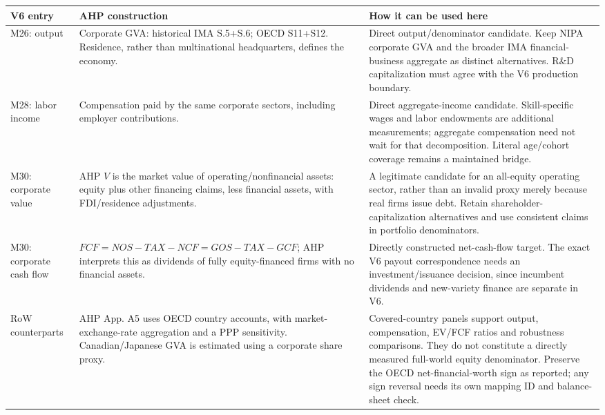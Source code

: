 \documentclass[10pt,a4paper,landscape]{article}
\begin{document}
\begin{longtable}{@{}P{.17\textwidth}P{.38\textwidth}P{.41\textwidth}@{}}
\toprule{}\textbf{V6 entry} & \textbf{AHP construction} & \textbf{How it can be used here}\\\midrule
M26: output & Corporate GVA: historical IMA S.5+S.6; OECD S11+S12. Residence, rather than multinational headquarters, defines the economy. & Direct output/denominator candidate. Keep NIPA corporate GVA and the broader IMA financial-business aggregate as distinct alternatives. R\&D capitalization must agree with the V6 production boundary.\\[6pt]
M28: labor income & Compensation paid by the same corporate sectors, including employer contributions. & Direct aggregate-income candidate. Skill-specific wages and labor endowments are additional measurements; aggregate compensation need not wait for that decomposition. Literal age/cohort coverage remains a maintained bridge.\\[6pt]
M30: corporate value & AHP $V$ is the market value of operating/nonfinancial assets: equity plus other financing claims, less financial assets, with FDI/residence adjustments. & A legitimate candidate for an all-equity operating sector, rather than an invalid proxy merely because real firms issue debt. Retain shareholder-capitalization alternatives and use consistent claims in portfolio denominators.\\[6pt]
M30: corporate cash flow & $FCF=NOS-TAX-NCF=GOS-TAX-GCF$; AHP interprets this as dividends of fully equity-financed firms with no financial assets. & Directly constructed net-cash-flow target. The exact V6 payout correspondence needs an investment/issuance decision, since incumbent dividends and new-variety finance are separate in V6.\\[6pt]
RoW counterparts & AHP App. A5 uses OECD country accounts, with market-exchange-rate aggregation and a PPP sensitivity. Canadian/Japanese GVA is estimated using a corporate share proxy. & Covered-country panels support output, compensation, EV/FCF ratios and robustness comparisons. They do not constitute a directly measured full-world equity denominator. Preserve the OECD net-financial-worth sign as reported; any sign reversal needs its own mapping ID and balance-sheet check.\\
\bottomrule
\end{longtable}
\end{document}
